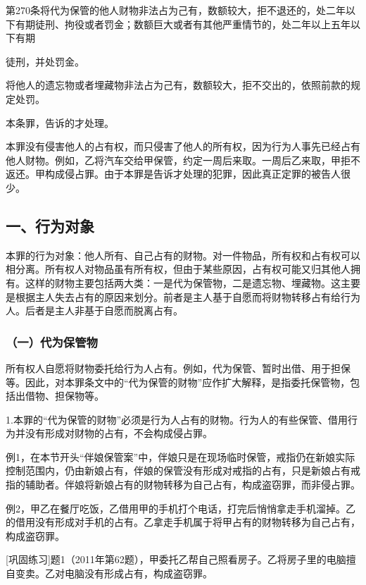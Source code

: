 第270条将代为保管的他人财物非法占为己有，数额较大，拒不退还的，处二年以下有期徒刑、拘役或者罚金；数额巨大或者有其他严重情节的，处二年以上五年以下有期

徒刑，并处罚金。

将他人的遗忘物或者埋藏物非法占为己有，数额较大，拒不交出的，依照前款的规定处罚。

本条罪，告诉的才处理。

本罪没有侵害他人的占有权，而只侵害了他人的所有权，因为行为人事先已经占有他人财物。例如，乙将汽车交给甲保管，约定一周后来取。一周后乙来取，甲拒不返还。甲构成侵占罪。由于本罪是告诉才处理的犯罪，因此真正定罪的被告人很少。


\subsection*{一、行为对象}

本罪的行为对象：他人所有、自己占有的财物。对一件物品，所有权和占有权可以相分离。所有权人对物品虽有所有权，但由于某些原因，占有权可能又归其他人拥有。这样的财物主要包括两大类：一是代为保管物，二是遗忘物、埋藏物。这主要是根据主人失去占有的原因来划分。前者是主人基于自愿而将财物转移占有给行为人。后者是主人非基于自愿而脱离占有。

\subsubsection*{（一）代为保管物}

所有权人自愿将财物委托给行为人占有。例如，代为保管、暂时出借、用于担保等。因此，对本罪条文中的“代为保管的财物”应作扩大解释，是指委托保管物，包括出借物、担保物等。

1.本罪的“代为保管的财物”必须是行为人占有的财物。行为人的有些保管、借用行为并没有形成对财物的占有，不会构成侵占罪。

例1，在本节开头“伴娘保管案”中，伴娘只是在现场临时保管，戒指仍在新娘实际控制范围内，仍由新娘占有，伴娘的保管没有形成对戒指的占有，只是新娘占有戒指的辅助者。伴娘将新娘占有的财物转移为自己占有，构成盗窃罪，而非侵占罪。

例2，甲乙在餐厅吃饭，乙借用甲的手机打个电话，打完后悄悄拿走手机溜掉。乙的借用没有形成对手机的占有。乙拿走手机属于将甲占有的财物转移为自己占有，构成盗窃罪。

[巩固练习]题1（2011年第62题），甲委托乙帮自己照看房子。乙将房子里的电脑擅自变卖。乙对电脑没有形成占有，构成盗窃罪。

